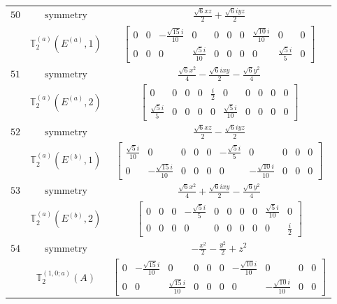 \documentclass[fleqn,8pt,landscape]{jsarticle}
\begin{document}
\begin{longtable}{ccc}
$ 50 $ & $ \text{symmetry} $ & $ \frac{\sqrt{6} x z}{2} + \frac{\sqrt{6} i y z}{2} $ \\
$  $ & $ \mathbb{T}_{2}^{(a)}(E^{(a)},1) $ & $ \begin{bmatrix} 0 & 0 & - \frac{\sqrt{15} i}{10} & 0 & 0 & 0 & 0 & \frac{\sqrt{10} i}{10} & 0 & 0 \\ 0 & 0 & 0 & \frac{\sqrt{5} i}{10} & 0 & 0 & 0 & 0 & \frac{\sqrt{5} i}{5} & 0 \end{bmatrix} $ \\ \hline
$ 51 $ & $ \text{symmetry} $ & $ \frac{\sqrt{6} x^{2}}{4} - \frac{\sqrt{6} i x y}{2} - \frac{\sqrt{6} y^{2}}{4} $ \\
$  $ & $ \mathbb{T}_{2}^{(a)}(E^{(a)},2) $ & $ \begin{bmatrix} 0 & 0 & 0 & 0 & \frac{i}{2} & 0 & 0 & 0 & 0 & 0 \\ \frac{\sqrt{5} i}{5} & 0 & 0 & 0 & 0 & \frac{\sqrt{5} i}{10} & 0 & 0 & 0 & 0 \end{bmatrix} $ \\ \hline
$ 52 $ & $ \text{symmetry} $ & $ \frac{\sqrt{6} x z}{2} - \frac{\sqrt{6} i y z}{2} $ \\
$  $ & $ \mathbb{T}_{2}^{(a)}(E^{(b)},1) $ & $ \begin{bmatrix} \frac{\sqrt{5} i}{10} & 0 & 0 & 0 & 0 & - \frac{\sqrt{5} i}{5} & 0 & 0 & 0 & 0 \\ 0 & - \frac{\sqrt{15} i}{10} & 0 & 0 & 0 & 0 & - \frac{\sqrt{10} i}{10} & 0 & 0 & 0 \end{bmatrix} $ \\ \hline
$ 53 $ & $ \text{symmetry} $ & $ \frac{\sqrt{6} x^{2}}{4} + \frac{\sqrt{6} i x y}{2} - \frac{\sqrt{6} y^{2}}{4} $ \\
$  $ & $ \mathbb{T}_{2}^{(a)}(E^{(b)},2) $ & $ \begin{bmatrix} 0 & 0 & 0 & - \frac{\sqrt{5} i}{5} & 0 & 0 & 0 & 0 & \frac{\sqrt{5} i}{10} & 0 \\ 0 & 0 & 0 & 0 & 0 & 0 & 0 & 0 & 0 & \frac{i}{2} \end{bmatrix} $ \\ \hline
$ 54 $ & $ \text{symmetry} $ & $ - \frac{x^{2}}{2} - \frac{y^{2}}{2} + z^{2} $ \\
$  $ & $ \mathbb{T}_{2}^{(1,0;a)}(A) $ & $ \begin{bmatrix} 0 & - \frac{\sqrt{15} i}{10} & 0 & 0 & 0 & 0 & - \frac{\sqrt{10} i}{10} & 0 & 0 & 0 \\ 0 & 0 & \frac{\sqrt{15} i}{10} & 0 & 0 & 0 & 0 & - \frac{\sqrt{10} i}{10} & 0 & 0 \end{bmatrix} $ \\ \hline

\end{longtable}
\end{document}
